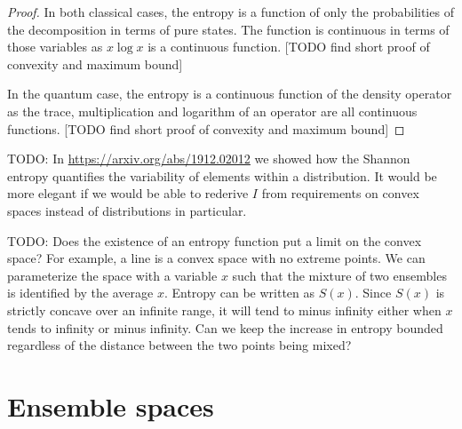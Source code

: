 \begin{proof}
	In both classical cases, the entropy is a function of only the probabilities of the decomposition in terms of pure states. The function is continuous in terms of those variables as $x \log x$ is a continuous function. [TODO find short proof of convexity and maximum bound]
	
	In the quantum case, the entropy is a continuous function of the density operator as the trace, multiplication and logarithm of an operator are all continuous functions. [TODO find short proof of convexity and maximum bound]
\end{proof}

\begin{remark}
	TODO: In \url{https://arxiv.org/abs/1912.02012} we showed how the Shannon entropy quantifies the variability of elements within a distribution. It would be more elegant if we would be able to rederive $I$ from requirements on convex spaces instead of distributions in particular.
	
	TODO: Does the existence of an entropy function put a limit on the convex space? For example, a line is a convex space with no extreme points. We can parameterize the space with a variable $x$ such that the mixture of two ensembles is identified by the average $x$. Entropy can be written as $S(x)$. Since $S(x)$ is strictly concave over an infinite range, it will tend to minus infinity either when $x$ tends to infinity or minus infinity. Can we keep the increase in entropy bounded regardless of the distance between the two points being mixed? 
\end{remark}

\section{Ensemble spaces}

